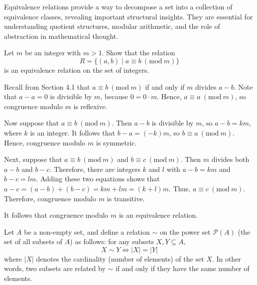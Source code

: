 Equivalence relations provide a way to decompose a set into a collection of equivalence classes, revealing important structural insights. They are essential for understanding quotient structures, modular arithmetic, and the role of abstraction in mathematical thought.

\begin{example}
	Let \(m\) be an integer with \(m > 1\). Show that the relation
	\[ R = \{(a, b) \mid a \equiv b \ (\mathrm{mod} \ m)\} \]
	is an equivalence relation on the set of integers.
\end{example}

\begin{solution}
	Recall from Section 4.1 that \(a \equiv b \ (\mathrm{mod} \ m)\) if and only if \(m\) divides \(a - b\). Note that \(a - a = 0\) is divisible by \(m\), because \(0 = 0 \cdot m\). Hence, \(a \equiv a \ (\mathrm{mod} \ m)\), so congruence modulo \(m\) is reflexive.
	
	Now suppose that \(a \equiv b \ (\mathrm{mod} \ m)\). Then \(a - b\) is divisible by \(m\), so \(a - b = km\), where \(k\) is an integer. It follows that \(b - a = (-k)m\), so \(b \equiv a \ (\mathrm{mod} \ m)\). Hence, congruence modulo \(m\) is symmetric.
	
	Next, suppose that \(a \equiv b \ (\mathrm{mod} \ m)\) and \(b \equiv c \ (\mathrm{mod} \ m)\). Then \(m\) divides both \(a - b\) and \(b - c\). Therefore, there are integers \(k\) and \(l\) with \(a - b = km\) and \(b - c = lm\). Adding these two equations shows that \(a - c = (a - b) + (b - c) = km + lm = (k + l) m\). Thus, \(a \equiv c \ (\mathrm{mod} \ m)\). Therefore, congruence modulo \(m\) is transitive.
	
	It follows that congruence modulo \(m\) is an equivalence relation.
\end{solution}

\begin{example}
	Let $A$ be a non-empty set, and define a relation $\sim$ on the power set $\mathcal{P}(A)$ (the set of all subsets of $A$) as follows: for any subsets $X, Y \subseteq A$,
	$$
	X \sim Y \iff |X| = |Y|
	$$
	where $|X|$ denotes the cardinality (number of elements) of the set $X$. In other words, two subsets are related by $\sim$ if and only if they have the same number of elements.
\end{example}

